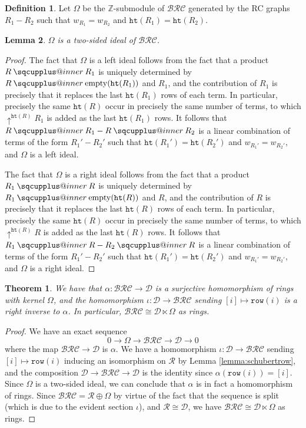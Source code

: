 \documentclass{amsart}
\makeatletter
\newcommand{\sqcupplus@inner}[2]{%
  \vcenter{\hbox{\ooalign{%
    \hfil$\m@th#1\sqcup$\hfil\cr
    \hfil\raisebox{0.15ex}{$\m@th#1\scriptscriptstyle+$}\hfil\cr
  }}}%
}
\newcommand{\sqcupplus}{\mathbin{\mathpalette\sqcupplus@inner\relax}}
\newtheorem{lemma}{Lemma}[subsection]
\newtheorem{theorem}{Theorem}[section]
\theoremstyle{definition}
\newtheorem{definition}[lemma]{Definition}
\theoremstyle{remark}
\numberwithin{equation}{subsection}
\newcommand{\shup}{{\uparrow}}
\newcommand{\wof}[1]{w_{#1}}
\newcommand{\hr}{\mathtt{ht}}
\newcommand{\BRC}{\mathcal{BRC}}
\newcommand{\dcoma}{\mathcal{D}}
\makeatother
\begin{document}
\begin{definition}\label{definition:omega}
Let $\Omega$ be the $\mathbb{Z}$-submodule of $\BRC$ generated by the RC graphs $R_1-R_2$ such that $\wof{R_1}=\wof{R_2}$ and $\hr(R_1)=\hr(R_2)$.
\end{definition}

\begin{lemma}
$\Omega$ is a two-sided ideal of $\BRC$.
\end{lemma}
\begin{proof}
  The fact that $\Omega$ is a left ideal follows from the fact that a product $R\sqcupplus R_1$ is uniquely determined by $R\sqcupplus \mathrm{empty}(\hr(R_1))$ and $R_1$, and the contribution of $R_1$ is precisely that it replaces the last $\hr(R_1)$ rows of each term. In particular, precisely the same $\hr(R)$ occur in precisely the same number of terms, to which $\shup^{\hr(R)}R_1$ is added as the last $\hr(R_1)$ rows. It follows that $R\sqcupplus R_1 - R\sqcupplus R_2$ is a linear combination of terms of the form $R_1' - R_2'$ such that $\hr(R_1') = \hr(R_2')$ and $\wof{R_1'} = \wof{R_2'}$, and $\Omega$ is a left ideal.

  The fact that $\Omega$ is a right ideal follows from the fact that a product $R_1\sqcupplus R$ is uniquely determined by $R_1\sqcupplus \mathrm{empty}(\hr(R))$ and $R$, and the contribution of $R$ is precisely that it replaces the last $\hr(R)$ rows of each term. In particular, precisely the same $\hr(R)$ occur in precisely the same number of terms, to which $\shup^{\hr(R)}R$ is added as the last $\hr(R)$ rows. It follows that $R_1\sqcupplus R - R_2\sqcupplus R$ is a linear combination of terms of the form $R_1' - R_2'$ such that $\hr(R_1') = \hr(R_2')$ and $\wof{R_1'} = \wof{R_2'}$, and $\Omega$ is a right ideal.
\end{proof}

\begin{theorem} \label{theorem:semidirect}
  We have that $\alpha:\BRC\to \dcoma$ is a surjective homomorphism of rings with kernel $\Omega$, and the homomorphism $\iota:\dcoma\to\BRC$ sending $[i]\mapsto \mathtt{row}(i)$ is a right inverse to $\alpha$. In particular, $\BRC\cong \dcoma\ltimes \Omega$ as rings.
\end{theorem}
\begin{proof}
  We have an exact sequence
$$0\to \Omega\to \BRC\to \dcoma\to 0$$
where the map $\BRC\to \dcoma$ is $\alpha$. We have a homomorphism $\iota:\dcoma\to \BRC$ sending $[i]\mapsto \mathtt{row}(i)$ inducing an isomorphism on $\mathcal{R}$ by Lemma \ref{lemma:schubertrow}, and the composition $\dcoma\to \BRC\to \dcoma$ is the identity since $\alpha(\mathtt{row}(i)) = [i]$. Since $\Omega$ is a two-sided ideal, we can conclude that $\alpha$ is in fact a homomorphism of rings. Since $\BRC = \mathcal{R}\oplus \Omega$ by virtue of the fact that the sequence is split (which is due to the evident section $\iota$), and $\mathcal{R}\cong \dcoma$, we have $\BRC\cong \dcoma\ltimes \Omega$ as rings.
\end{proof}
\end{document}
